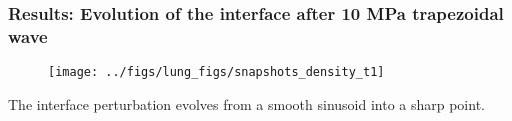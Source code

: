 \begin{frame} \frametitle{\vspace*{0.5cm}Results: Evolution of the interface after 10 MPa trapezoidal wave}
  \begin{figure}
    \centering
    \texttt{[image: ../figs/lung\_figs/snapshots\_density\_t1]}
  \end{figure}
  {\small
    The interface perturbation evolves from a smooth sinusoid into a sharp point.
  }
\end{frame}
